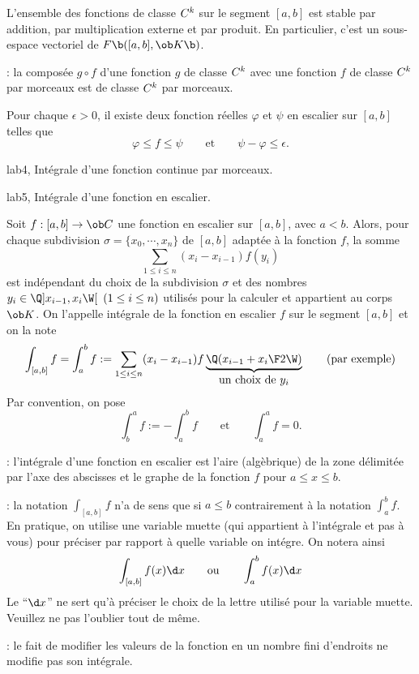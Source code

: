 \Propriete []  L'ensemble des fonctions de classe $\sc C^k$ sur le segment $[a,b]$ est stable par addition, par multiplication externe et par produit. En particulier, c'est un sous-espace vectoriel de $\sc F\b([a,b],\ob K\b)$. 
\bigskip

\Remarque : la composée $g\circ f$ d'une fonction $g$ de classe $\sc C^k$ avec une fonction $f$ de classe $\sc C^k$ par morceaux est de classe $\sc C^k$ par morceaux. 
\bigskip

Pour chaque $\epsilon>0$, il existe deux fonction réelles $\varphi$ et $\psi$ en escalier sur $[a,b]$ telles que 
$$
\varphi\le f\le \psi\qquad \mbox{et}\qquad \psi-\varphi\le \epsilon.
$$

\Section lab4, Intégrale d'une fonction continue par morceaux. 

\Subsection lab5, Intégrale d'une fonction en escalier. 

\Definition []  Soit $f:[a,b]\to\ob C$ une fonction en escalier sur $[a,b]$, avec $a<b$. Alors, pour chaque subdivision $\sigma=\{x_0,\cdots,x_n\}$ de $[a,b]$ adaptée à la fonction $f$, la somme 
$$
\sum_{1\le i\le n}(x_i-x_{i-1})f(y_i)
$$
est indépendant du choix de la subdivision $\sigma$ et des nombres $y_i\in\Q]x_{i-1},x_i\W[\ \,(1\le i\le n)$ utilisés pour la calculer et appartient au corps $\ob K$. On l'appelle intégrale de la fonction en escalier $f$ sur le segment $[a,b]$ et on la note 
$$
\int_{[a,b]}f= \int_a^bf:=\sum_{1\le i\le n}(x_i-x_{i-1})f\underbrace{\Q({x_{i-1}+x_i\F 2}\W)}_{\mbox{un choix de $y_i$}}\qquad\mbox{(par exemple)}
$$
Par convention, on pose 
$$
\int_b^af:=-\int_a^bf\qquad \mbox{et}\qquad \int_a^af=0.
$$

\Remarque : l'intégrale d'une fonction en escalier est l'aire (algèbrique) de la zone délimitée par l'axe des abscisses et le graphe de la fonction $f$ pour $a\le x\le b$. 
\bigskip

\Remarque : la notation $\int_{[a,b]}f$ n'a de sens que si $a\le b$ contrairement à la notation $\int_a^bf$. En pratique, on utilise une variable muette (qui appartient à l'intégrale et pas à vous) 
pour préciser par rapport à quelle variable on intégre. On notera ainsi
$$
\int_{[a,b]}f(x)\d x\qquad \mbox{ou}\qquad \int_a^bf(x)\d x
$$
Le ``$\d x$'' ne sert qu'à préciser le choix de la lettre utilisé pour la variable muette. Veuillez ne pas l'oublier tout de même. 
\bigskip

\Remarque  : le fait de modifier les valeurs de la fonction en un nombre fini d'endroits ne modifie pas son intégrale. 
\bigskip

